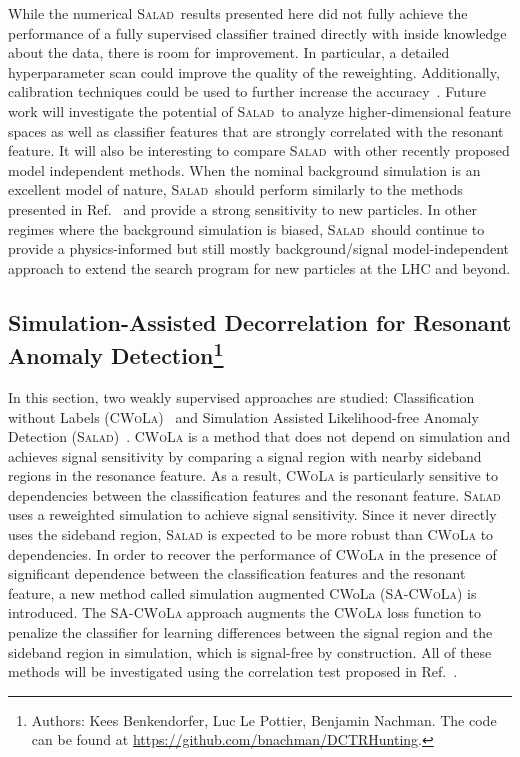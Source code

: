 \documentclass[a4paper,11pt]{article}
\begin{document}
While the numerical \textsc{Salad}~results presented here did not fully achieve the performance of a fully supervised classifier trained directly with inside knowledge about the data, there is room for improvement.  In particular, a detailed hyperparameter scan could improve the quality of the reweighting.  Additionally, calibration techniques could be used to further increase the accuracy~\cite{Cranmer:2015bka}.  Future work will investigate the potential of \textsc{Salad}~to analyze higher-dimensional feature spaces as well as classifier features that are strongly correlated with the resonant feature.  It will also be interesting to compare \textsc{Salad}~with other recently proposed model independent methods.  When the nominal background simulation is an excellent model of nature, \textsc{Salad}~should perform similarly to the methods presented in Ref.~\cite{DAgnolo:2018cun,DAgnolo:2019vbw} and provide a strong sensitivity to new particles.  In other regimes where the background simulation is biased, \textsc{Salad}~should continue to provide a physics-informed but still mostly background/signal model-independent approach to extend the search program for new particles at the LHC and beyond.


 \FloatBarrier
\subsection[Simulation-Assisted Decorrelation for Resonant Anomaly Detection]{Simulation-Assisted Decorrelation for Resonant Anomaly Detection\footnote{Authors: Kees Benkendorfer, Luc Le Pottier, Benjamin Nachman.  The code can be found at \url{https://github.com/bnachman/DCTRHunting}.}}

\label{sec:sacwola}

In this section, two weakly supervised approaches are studied: Classification without Labels (\textsc{CWoLa})~\cite{Metodiev:2017vrx,Collins:2018epr,Collins:2019jip,collaboration2020dijet} and Simulation Assisted Likelihood-free Anomaly Detection (\textsc{Salad})~\cite{Andreassen:2020nkr}. \textsc{CWoLa} is a method that does not depend on simulation and achieves signal sensitivity by comparing a signal region with nearby sideband regions in the resonance feature.  As a result, \textsc{CWoLa} is particularly sensitive to dependencies between the classification features and the resonant feature.  \textsc{Salad} uses a reweighted simulation to achieve signal sensitivity.  Since it never directly uses the sideband region, \textsc{Salad} is expected to be more robust than \textsc{CWoLa} to dependencies.  In order to recover the performance of \textsc{CWoLa} in the presence of significant dependence between the classification features and the resonant feature, a new method called simulation augmented CWoLa (SA-\textsc{CWoLa}) is introduced.  The SA-\textsc{CWoLa} approach augments the \textsc{CWoLa} loss function to penalize the classifier for learning differences between the signal region and the sideband region in simulation, which is signal-free by construction.  All of these methods will be investigated using the correlation test proposed in Ref.~\cite{Nachman:2020lpy}.
\end{document}
